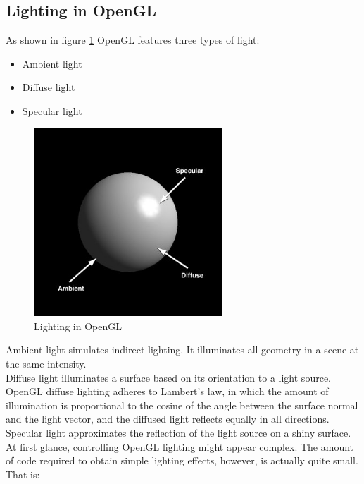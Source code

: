 \subsection{Lighting in OpenGL}
\label{sec:opengl:light}
\lstset{language=C++}

As shown in figure \ref{fig:lighting} OpenGL features three types of light:

\begin{itemize}
  \item Ambient light
  \item Diffuse light
  \item Specular light
\end{itemize}

\begin{figure}[!h]
  \begin{center}
    \includegraphics[width=200pt]{img/light}
    \caption{Lighting in OpenGL}
    \label{fig:lighting}
  \end{center}
\end{figure}

Ambient light simulates indirect lighting. It illuminates all 
geometry in a scene at the same intensity.
\\
Diffuse light illuminates a surface based on its orientation 
to a light source. OpenGL diffuse lighting adheres to 
Lambert's law, in which the amount of illumination is proportional 
to the cosine of the angle between the surface normal and the 
light vector, and the diffused light reflects equally in 
all directions.
\\
Specular light approximates the reflection of the light source on 
a shiny surface.
\\
At first glance, controlling OpenGL lighting might appear complex. 
The amount of code required to obtain simple lighting effects, 
however, is actually quite small. That is:

